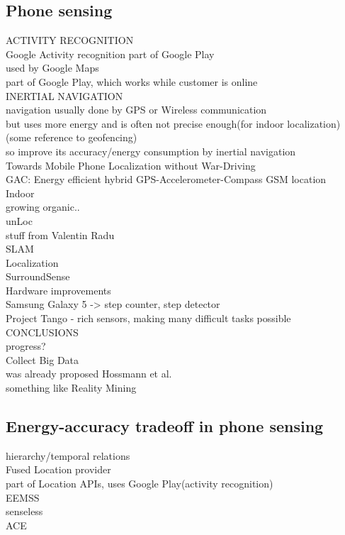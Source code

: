 \subsection{Phone sensing}
ACTIVITY RECOGNITION\\
	Google Activity recognition part of Google Play \cite{android:activityrecognition}\\
		used by Google Maps\\
		part of Google Play, which works while customer is online\\

INERTIAL NAVIGATION\\
	navigation usually done by GPS or Wireless communication\\
	but uses more energy and is often not precise enough(for indoor localization)\\
		(some reference to geofencing)\\
	so improve its accuracy/energy consumption by inertial navigation\\
	Towards Mobile Phone Localization without War-Driving\cite{constandache:localization}\\
	GAC: Energy efficient hybrid GPS-Accelerometer-Compass GSM location\\
	Indoor\\
		growing organic..\\
		unLoc\\
		stuff from Valentin Radu\\
	
SLAM\\

Localization \\
	SurroundSense \cite{azizyan:surroundsense}\\

Hardware improvements\\
	Samsung Galaxy 5 -> step counter, step detector\\
	Project Tango - rich sensors, making many difficult tasks possible\cite{google:tango}\\

CONCLUSIONS\\
	progress?\\
	Collect Big Data\\
		was already proposed Hossmann et al.\cite{hossmann:bigdatasets}\\
		something like Reality Mining \cite{eagle:realitymining}\\
	
\subsection{Energy-accuracy tradeoff in phone sensing}
hierarchy/temporal relations\\
	Fused Location provider\cite{android:locationapi}\\
		part of Location APIs, uses Google Play(activity recognition)\\
	EEMSS \cite{wang:eemss}\\
	senseless \cite{benabdesslem:senseless}\\
	ACE \cite{nath:ace}\\

